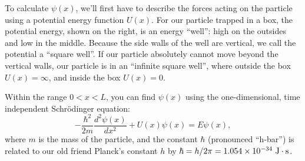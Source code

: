 To calculate $\psi(x)$, we'll first have to describe the forces acting on the particle using a potential energy function $U(x)$.
For our particle trapped in a box, the potential energy, shown on the right, is an energy ``well'': high on the outsides and low in the middle.  Because the side walls of the well are vertical, we call the potential a ``square well''.  If our particle absolutely cannot move beyond the vertical walls, our particle is in an ``infinite square well'', where outside the box $U(x)=\infty$, and inside the box $U(x)=0$.

\bigskip 
Within the range $0<x<L$, you can find $\psi(x)$ using the one-dimensional, time independent Schr\"odinger equation:
$$-\frac{\hbar^2}{2m} \frac{d^2\psi(x)}{dx^2} + U(x)\psi(x) = E\psi(x),$$
where $m$ is the mass of the particle, and the constant $\hbar$ (pronounced ``h-bar'') is related to our old friend Planck's constant $h$ by $\hbar = {h}/{2\pi} = 1.054 \times 10^{-34}~{\rm J} \cdot {\rm s}$.
\medskip
